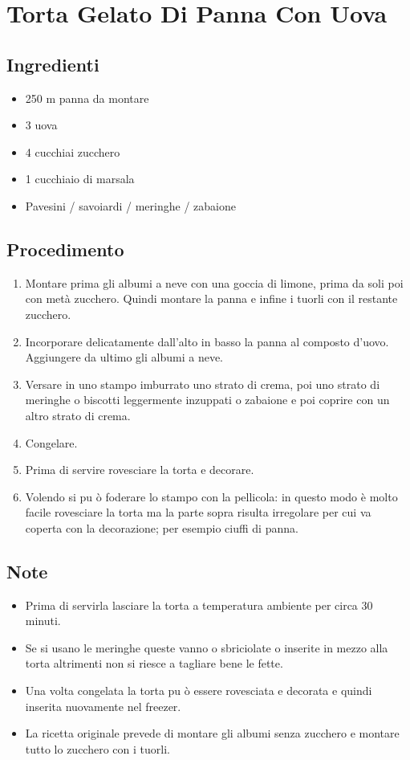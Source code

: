 \section{Torta Gelato Di Panna Con Uova}
\subsection{Ingredienti}
\begin{itemize}
\item 250 m panna da montare  
\item 3 uova  
\item 4 cucchiai zucchero  
\item 1 cucchiaio di marsala  
\item Pavesini / savoiardi / meringhe / zabaione
\end{itemize}
\subsection{Procedimento}
\begin{enumerate}
\item  Montare prima gli albumi a neve con una goccia di limone, prima da soli poi con metà zucchero. Quindi montare la panna e infine i tuorli con il restante zucchero.  
\item  Incorporare delicatamente dall'alto in basso la panna al composto d'uovo. Aggiungere da ultimo gli albumi a neve.  
\item  Versare in uno stampo imburrato uno strato di crema, poi uno strato di meringhe o biscotti leggermente inzuppati o zabaione e poi coprire con un altro strato di crema.   
\item  Congelare.  
\item  Prima di servire rovesciare la torta e decorare.  
\item  Volendo si pu ò foderare lo stampo con la pellicola: in questo modo è molto facile rovesciare la torta ma la parte sopra risulta irregolare per cui va coperta con la decorazione; per esempio ciuffi di panna.
\end{enumerate}
\subsection{Note}
\begin{itemize}
\item Prima di servirla lasciare la torta a temperatura ambiente per circa 30 minuti.  
\item Se si usano le meringhe queste vanno o sbriciolate o inserite in mezzo alla torta altrimenti non si riesce a tagliare bene le fette.  
\item Una volta congelata la torta pu ò essere rovesciata e decorata e quindi inserita nuovamente nel freezer.  
\item La ricetta originale prevede di montare gli albumi senza zucchero e montare tutto lo zucchero con i tuorli.
\end{itemize}
